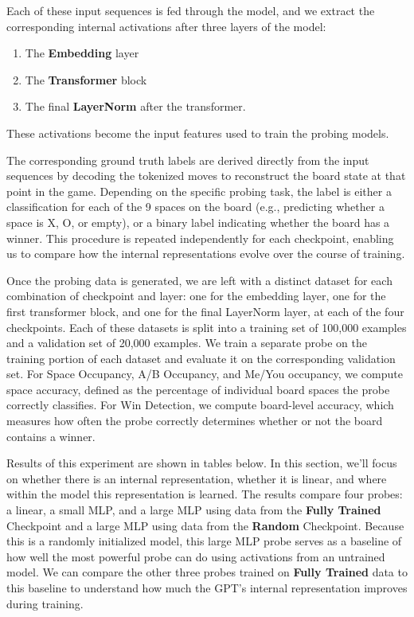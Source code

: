 \documentclass[11pt]{article}
\providecommand{\tightlist}{%
      \setlength{\itemsep}{0pt}\setlength{\parskip}{0pt}}
\begin{document}
Each of these input sequences is fed through the model, and we extract
the corresponding internal activations after three layers of the model:

\begin{enumerate}
\def\labelenumi{\arabic{enumi}.}
\tightlist
\item
  The \textbf{Embedding} layer
\item
  The \textbf{Transformer} block
\item
  The final \textbf{LayerNorm} after the transformer.
\end{enumerate}

These activations become the input features used to train the probing
models.

The corresponding ground truth labels are derived directly from the
input sequences by decoding the tokenized moves to reconstruct the board
state at that point in the game. Depending on the specific probing task,
the label is either a classification for each of the 9 spaces on the
board (e.g., predicting whether a space is X, O, or empty), or a binary
label indicating whether the board has a winner. This procedure is
repeated independently for each checkpoint, enabling us to compare how
the internal representations evolve over the course of training.

Once the probing data is generated, we are left with a distinct dataset
for each combination of checkpoint and layer: one for the embedding
layer, one for the first transformer block, and one for the final
LayerNorm layer, at each of the four checkpoints. Each of these datasets
is split into a training set of 100,000 examples and a validation set of
20,000 examples. We train a separate probe on the training portion of
each dataset and evaluate it on the corresponding validation set. For
Space Occupancy, A/B Occupancy, and Me/You occupancy, we compute space
accuracy, defined as the percentage of individual board spaces the probe
correctly classifies. For Win Detection, we compute board-level
accuracy, which measures how often the probe correctly determines
whether or not the board contains a winner.

Results of this experiment are shown in tables below. In this section,
we'll focus on whether there is an internal representation, whether it
is linear, and where within the model this representation is learned.
The results compare four probes: a linear, a small MLP, and a large MLP
using data from the \textbf{Fully Trained} Checkpoint and a large MLP
using data from the \textbf{Random} Checkpoint. Because this is a
randomly initialized model, this large MLP probe serves as a baseline of
how well the most powerful probe can do using activations from an
untrained model. We can compare the other three probes trained on
\textbf{Fully Trained} data to this baseline to understand how much the
GPT's internal representation improves during training.
\end{document}
